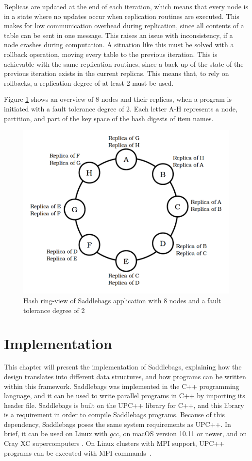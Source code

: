\documentclass{uit-report}
\begin{document}
Replicas are updated at the end of each iteration, which means that every node is in a state where no updates occur when replication routines are executed. This makes for low communication overhead during replication, since all contents of a table can be sent in one message. This raises an issue with inconsistency, if a node crashes during computation. A situation like this must be solved with a rollback operation, moving every table to the previous iteration. This is achievable with the same replication routines, since a back-up of the state of the previous iteration exists in the current replicas. This means that, to rely on rollbacks, a replication degree of at least 2 must be used. 

Figure \ref{fig:ring} shows an overview of 8 nodes and their replicas, when a program is initiated with a fault tolerance degree of 2. Each letter A-H represents a node, partition, and part of the key space of the hash digests of item names.

\vspace{1.5cm}
\begin{figure}[H]
	\centering
	\includegraphics[width=12cm]{illustrations/png/ring.png}
	\caption{Hash ring-view of Saddlebags application with 8 nodes and a fault tolerance degree of 2}
	\label{fig:ring}
\end{figure}

\newpage
\mbox{}
\newpage
\chapter{Implementation}
This chapter will present the implementation of Saddlebags, explaining how the design translates into different data structures, and how programs can be written within this framework. Saddlebags was implemented in the C++ programming language, and it can be used to write parallel programs in C++ by importing its header file. Saddlebags is built on the UPC++ library for C++, and this library is a requirement in order to compile Saddlebags programs. Because of this dependency, Saddlebags poses the same system requirements as UPC++. In brief, it can be used on Linux with $gcc$, on macOS version 10.11 or newer, and on Cray XC supercomputers \cite{upcreq}. On Linux clusters with MPI support, UPC++ programs can be executed with MPI commands~\cite{upcmpi}.
\end{document}
